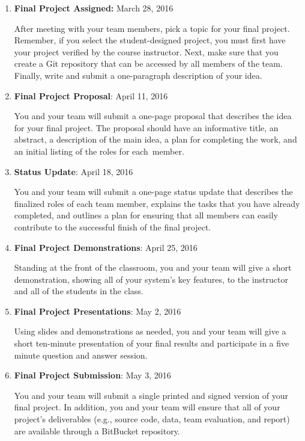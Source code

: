 \vspace*{-.05in}
\begin{enumerate}

  \itemsep0in

  \item {\bf Final Project Assigned:} March 28, 2016

    After meeting with your team members, pick a topic for your final project.  Remember, if you select the
    student-designed project, you must first have your project verified by the course instructor.  Next, make sure that
    you create a Git repository that can be accessed by all members of the team. Finally, write and submit a
    one-paragraph description of your idea.

  \item {\bf Final Project Proposal}: April 11, 2016

    You and your team will submit a one-page proposal that describes the idea for your final project.  The proposal
    should have an informative title, an abstract, a description of the main idea, a plan for completing the work, and
    an initial listing of the roles for \mbox{each member}.

  \item {\bf Status Update}: April 18, 2016

    You and your team will submit a one-page status update that describes the finalized roles of each team member,
    explains the tasks that you have already completed, and outlines a plan for ensuring that all members can easily
    contribute to the successful finish of the final project.

  \item {\bf Final Project Demonstrations}: April 25, 2016

    Standing at the front of the classroom, you and your team will give a short demonstration, showing all of your
    system's key features, to the instructor and all of the students in the class.

  \item {\bf Final Project Presentations}: May 2, 2016

    Using slides and demonstrations as needed, you and your team will give a short ten-minute presentation of your final
    results and participate in a five minute question and answer session.

  \item {\bf Final Project Submission}: May 3, 2016

    You and your team will submit a single printed and signed version of your final project. In addition, you and your
    team will ensure that all of your project's deliverables (e.g., source code, data, team evaluation, and report) are
    available through a BitBucket repository.

\end{enumerate}

